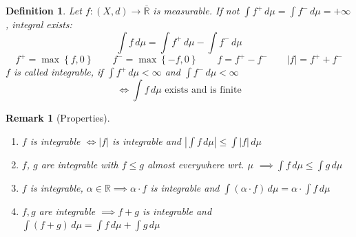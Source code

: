 \documentclass[a4paper]{article}
\newcounter{lecref}[section]
\numberwithin{lecref}{section}
\theoremstyle{break}
\newtheorem{definition}[lecref]{Definition}
\newtheorem{remark}[lecref]{Remark}
\newcommand{\Abs}[1]{\left|#1\right|}
\newcommand{\Set}[1]{\left\{#1\right\}}
\begin{document}
\begin{definition}
  Let $f: (X, d) \to \overline{\mathbb R}$ is measurable.
  If not $\int f^+ \, d\mu = \int f^- \, d\mu = +\infty$,
  integral exists:
  \[ \int f \, d\mu = \int f^+ \, d\mu - \int f^- \, d\mu \]
  \[ f^+ = \max\Set{f, 0} \qquad f^- = \max\Set{-f, 0} \qquad f = f^+ - f^- \qquad \Abs{f} = f^+ + f^- \]
  $f$ is called integrable, if $\int f^+ \, d\mu < \infty$ and $\int f^- \, d\mu < \infty$
  \[ \iff \int f \, d\mu \text{ exists and is finite} \]
\end{definition}

\begin{remark}[Properties]\hfill
  \begin{enumerate}
    \item $f$ is integrable $\iff \Abs{f}$ is integrable and $\Abs{\int f \, d\mu} \leq \int \Abs{f} \, d\mu$
    \item $f$, $g$ are integrable with $f \leq g$ almost everywhere wrt. $\mu$ $\implies \int f \, d\mu \leq \int g \, d\mu$
    \item $f$ is integrable, $\alpha \in \mathbb R \implies \alpha \cdot f$ is integrable and $\int (\alpha \cdot f) \, d\mu = \alpha \cdot \int f \, d\mu$
    \item $f, g$ are integrable $\implies f + g$ is integrable and $\int (f + g) \, d\mu = \int f \, d\mu + \int g \, d\mu$
  \end{enumerate}
\end{remark}

\end{document}
